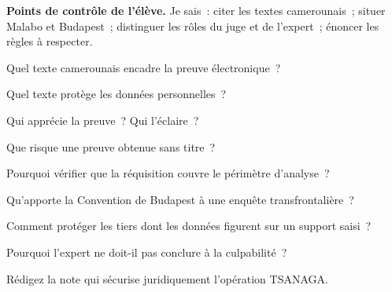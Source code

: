 \begin{boxinfo}
\textbf{Points de contrôle de l'élève.} Je sais~: citer les textes
camerounais~; situer Malabo et Budapest~; distinguer les rôles du juge et de
l'expert~; énoncer les règles à respecter.
\end{boxinfo}

\bigskip

\begin{boxexo}[title={\ding{45}\quad Exercice~4.1. Le texte \niveaubase}]
Quel texte camerounais encadre la preuve électronique~?
\end{boxexo}

\begin{boxexo}[title={\ding{45}\quad Exercice~4.2. Données \niveaubase}]
Quel texte protège les données personnelles~?
\end{boxexo}

\begin{boxexo}[title={\ding{45}\quad Exercice~4.3. Juge ou expert \niveaubase}]
Qui apprécie la preuve~? Qui l'éclaire~?
\end{boxexo}

\begin{boxexo}[title={\ding{45}\quad Exercice~4.4. Sans titre \niveaumoyen}]
Que risque une preuve obtenue sans titre~?
\end{boxexo}

\begin{boxexo}[title={\ding{45}\quad Exercice~4.5. Périmètre \niveaumoyen}]
Pourquoi vérifier que la réquisition couvre le périmètre d'analyse~?
\end{boxexo}

\begin{boxexo}[title={\ding{45}\quad Exercice~4.6. Budapest \niveaumoyen}]
Qu'apporte la Convention de Budapest à une enquête transfrontalière~?
\end{boxexo}

\begin{boxexo}[title={\ding{45}\quad Exercice~4.7. Tiers \niveaumoyen}]
Comment protéger les tiers dont les données figurent sur un support saisi~?
\end{boxexo}

\begin{boxexo}[title={\ding{45}\quad Exercice~4.8. La frontière \niveaumoyen}]
Pourquoi l'expert ne doit-il pas conclure à la culpabilité~?
\end{boxexo}

\begin{boxexo}[title={\ding{45}\quad Exercice~4.9. Note juridique \niveauexpert}]
Rédigez la note qui sécurise juridiquement l'opération TSANAGA.
\end{boxexo}

